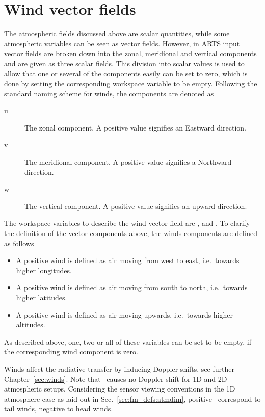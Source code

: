 \section{Wind vector fields}
\label{sec:atm:windfields}
%
The atmospheric fields discussed above are scalar quantities, while some
atmospheric variables can be seen as vector fields. However, in ARTS input
vector fields are broken down into the zonal, meridional and vertical
components and are given as three scalar fields. This division into scalar
values is used to allow that one or several of the components easily can be set
to zero, which is done by setting the corresponding workspace variable to be
empty. Following the standard naming scheme for winds, the components are
denoted as
\begin{description}
\item[u] The zonal component. A positive value signifies an Eastward direction.
\item[v] The meridional component. A positive value signifies a Northward
  direction.
\item[w] The vertical component. A positive value signifies an upward
  direction.
\end{description}
The workspace variables to describe the wind vector field are
,  and
. To clarify the definition of the vector components
above, the winds components are defined as follows
\begin{itemize}
\item[\WindWE] A positive wind is defined as air moving
  from west to east, i.e.\ towards higher longitudes.
\item[\WindSN] A positive wind is defined as air
  moving from south to north, i.e.\ towards higher latitudes.
\item[\WindVe] A positive wind is defined as air
  moving upwards, i.e.\ towards higher altitudes.
\end{itemize}
As described above, one, two or all of these variables can be set to be empty,
if the corresponding wind component is zero.

Winds affect the radiative transfer by inducing Doppler shifts, see further
Chapter~\ref{sec:winds}. Note that \WindWE\ causes no Doppler shift for 1D and 2D
atmospheric setups. Considering the sensor viewing conventions in the 1D
atmosphere case as laid out in Sec.~\ref{sec:fm_defs:atmdim}, positive \WindSN\
correspond to tail winds, negative to head winds.


